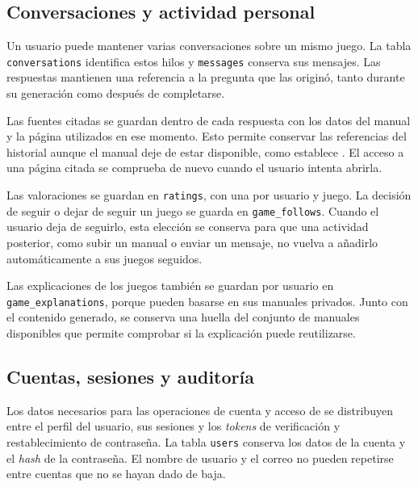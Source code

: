 
\FloatBarrier
\subsection{Conversaciones y actividad personal}

Un usuario puede mantener varias conversaciones sobre un mismo juego. La tabla
\texttt{conversations} identifica estos hilos y \texttt{messages} conserva
sus mensajes. Las respuestas mantienen una referencia a la pregunta que las
originó, tanto durante su generación como después de completarse.

Las fuentes citadas se guardan dentro de cada respuesta con los datos del
manual y la página utilizados en ese momento. Esto permite conservar las
referencias del historial aunque el manual deje de estar disponible, como
establece . El acceso a una página citada se comprueba
de nuevo cuando el usuario intenta abrirla.


Las valoraciones se guardan en \texttt{ratings}, con una por usuario y juego.
La decisión de seguir o dejar de seguir un juego se guarda en
\texttt{game\_\allowbreak{}follows}. Cuando el usuario deja de seguirlo,
esta elección se conserva para que una actividad posterior, como subir un manual
o enviar un mensaje, no vuelva a añadirlo automáticamente a sus juegos seguidos.

Las explicaciones de los juegos también se guardan por usuario en
\texttt{game\_\allowbreak{}explanations}, porque pueden basarse en sus manuales
privados. Junto con el contenido generado, se conserva una huella del
conjunto de manuales disponibles que permite comprobar si la explicación
puede reutilizarse.


\FloatBarrier
\subsection{Cuentas, sesiones y auditoría}

Los datos necesarios para las operaciones de cuenta y acceso de
\mbox{} se distribuyen entre el perfil del usuario, sus sesiones
y los \textit{tokens} de verificación y restablecimiento de contraseña. La tabla
\texttt{users} conserva los datos de la cuenta y el \textit{hash} de la
contraseña. El nombre de usuario y el correo no pueden repetirse entre
cuentas que no se hayan dado de baja.

